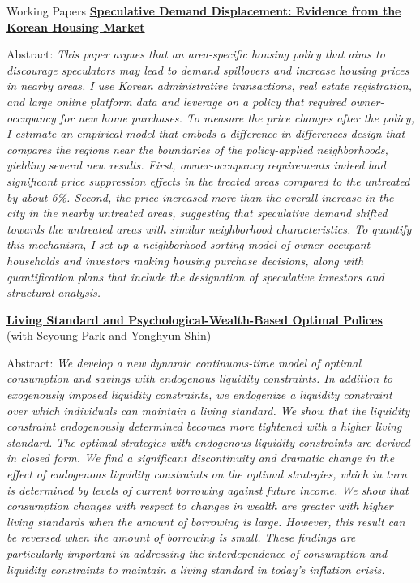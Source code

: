 \documentclass{resume} %
\begin{document}
	\begin{rSection}{Working Papers}
		\href{chanwoolkim.github.io}{\textbf{Speculative Demand Displacement: Evidence from the Korean Housing Market}}
		
		Abstract: \textit{This paper argues that an area-specific housing policy that aims to discourage speculators may lead to demand spillovers and increase housing prices in nearby areas. I use Korean administrative transactions, real estate registration, and large online platform data and leverage on a policy that required owner-occupancy for new home purchases. To measure the price changes after the policy, I estimate an empirical model that embeds a difference-in-differences design that compares the regions near the boundaries of the policy-applied neighborhoods, yielding several new results. First, owner-occupancy requirements indeed had significant price suppression effects in the treated areas compared to the untreated by about 6\%. Second, the price increased more than the overall increase in the city in the nearby untreated areas, suggesting that speculative demand shifted towards the untreated areas with similar neighborhood characteristics. To quantify this mechanism, I set up a neighborhood sorting model of owner-occupant households and investors making housing purchase decisions, along with quantification plans that include the designation of speculative investors and structural analysis.}
		
		\href{chanwoolkim.github.io}{\textbf{Living Standard and Psychological-Wealth-Based Optimal Polices}} \\ (with Seyoung Park and Yonghyun Shin)
		
		Abstract: \textit{We develop a new dynamic continuous-time model of optimal consumption and savings with endogenous liquidity constraints. In addition to exogenously imposed liquidity constraints, we endogenize a liquidity constraint over which individuals can maintain a living standard. We show that the liquidity constraint endogenously determined becomes more tightened with a higher living standard. The optimal strategies with endogenous liquidity constraints are derived in closed form. We find a significant discontinuity and dramatic change in the effect of endogenous liquidity constraints on the optimal strategies, which in turn is determined by levels of current borrowing against future income. We show that consumption changes with respect to changes in wealth are greater with higher living standards when the amount of borrowing is large. However, this result can be reversed when the amount of borrowing is small. These findings are particularly important in addressing the interdependence of consumption and liquidity constraints to maintain a living standard in today's inflation crisis.}
	

\end{rSection}
\end{document}
